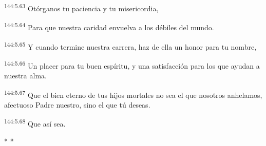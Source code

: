 \begin{center}
\par
\textsuperscript{144:5.63} Otórganos tu paciencia y tu misericordia,

\par
\textsuperscript{144:5.64} Para que nuestra caridad envuelva a los débiles del mundo.

\par
\textsuperscript{144:5.65} Y cuando termine nuestra carrera, haz de ella un honor para tu nombre,

\par
\textsuperscript{144:5.66} Un placer para tu buen espíritu, y una satisfacción para los que ayudan a nuestra alma.

\par
\textsuperscript{144:5.67} Que el bien eterno de tus hijos mortales no sea el que nosotros anhelamos, afectuoso Padre nuestro, sino el que tú deseas.

\par
\textsuperscript{144:5.68} Que así sea.
\end{center}

\begin{center}
	\par* * *
\end{center}

